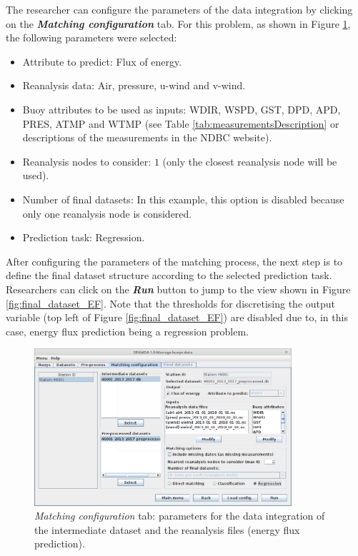 \documentclass[energies,article,accept,moreauthors,pdftex]{Definitions/mdpi}
\begin{document}
\begin{paracol}{2}
			The researcher can configure the parameters of the data integration by clicking on the \textbf{\textit{Matching configuration}} tab. For this problem, as shown in Figure \ref{fig:matching_conf_ef}, the following parameters were selected:
			\begin{itemize}
				\item Attribute to predict: Flux of energy.
				\item Reanalysis data: Air, pressure, u-wind and v-wind.
				\item Buoy attributes to be used as inputs: WDIR, WSPD, GST, DPD, APD, PRES, ATMP and WTMP (see Table \ref{tab:measurementsDescription} or descriptions of the measurements in the NDBC website).
				\item Reanalysis nodes to consider: $1$ (only the closest reanalysis node will be used).
				\item Number of final datasets: In this example, this option is disabled because only one reanalysis node is considered.
				\item Prediction task: Regression.
			\end{itemize} 
			
			After configuring the parameters of the matching process, the next step is to define the final dataset structure according to the selected prediction task. Researchers can click on the \textbf{\textit{Run}} button to jump to the view shown in Figure \ref{fig:final_dataset_EF}. Note that the thresholds for discretising the output variable (top left of  Figure \ref{fig:final_dataset_EF}) are disabled due to, in this case, energy flux prediction being a regression problem.
			
\end{paracol}
\nointerlineskip
\begin{figure}[H]
				\widefigure
				\includegraphics[width=0.85\textwidth]{figures/FigureMatching_configuration_EF.png}
				\caption{\textit{Matching configuration} tab: parameters for the data integration of the intermediate dataset and the reanalysis files (energy flux prediction).}\label{fig:matching_conf_ef}
			\end{figure}
\vspace{-6pt}
\end{document}
